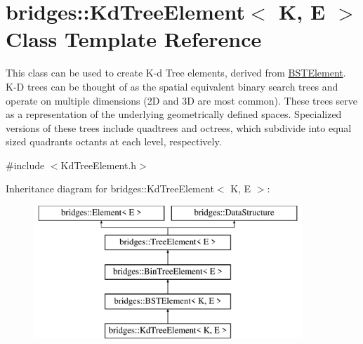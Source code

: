 \hypertarget{classbridges_1_1_kd_tree_element}{}\section{bridges\+:\+:Kd\+Tree\+Element$<$ K, E $>$ Class Template Reference}
\label{classbridges_1_1_kd_tree_element}


This class can be used to create K-\/d Tree elements, derived from \mbox{\hyperlink{classbridges_1_1_b_s_t_element}{B\+S\+T\+Element}}. K-\/D trees can be thought of as the spatial equivalent binary search trees and operate on multiple dimensions (2D and 3D are most common). These trees serve as a representation of the underlying geometrically defined spaces. Specialized versions of these trees include quadtrees and octrees, which subdivide into equal sized quadrants octants at each level, respectively.  




{\ttfamily \#include $<$Kd\+Tree\+Element.\+h$>$}

Inheritance diagram for bridges\+:\+:Kd\+Tree\+Element$<$ K, E $>$\+:\begin{figure}[H]
\begin{center}
\leavevmode
\includegraphics[height=5.000000cm]{classbridges_1_1_kd_tree_element}
\end{center}
\end{figure}
